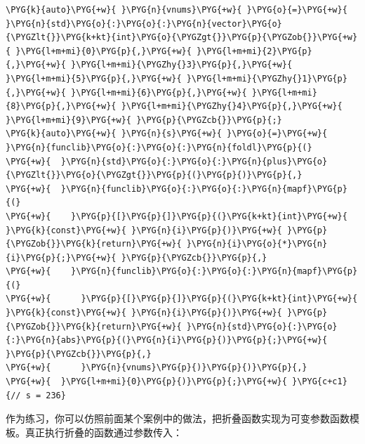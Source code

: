 
\begin{codeblockbg}
\begin{Verbatim}[commandchars=\\\{\},breaklines=true,breakanywhere=true,fontsize=\codefont,xleftmargin=17bp]
\PYG{k}{auto}\PYG{+w}{ }\PYG{n}{vnums}\PYG{+w}{ }\PYG{o}{=}\PYG{+w}{ }\PYG{n}{std}\PYG{o}{:}\PYG{o}{:}\PYG{n}{vector}\PYG{o}{\PYGZlt{}}\PYG{k+kt}{int}\PYG{o}{\PYGZgt{}}\PYG{p}{\PYGZob{}}\PYG{+w}{ }\PYG{l+m+mi}{0}\PYG{p}{,}\PYG{+w}{ }\PYG{l+m+mi}{2}\PYG{p}{,}\PYG{+w}{ }\PYG{l+m+mi}{\PYGZhy{}3}\PYG{p}{,}\PYG{+w}{ }\PYG{l+m+mi}{5}\PYG{p}{,}\PYG{+w}{ }\PYG{l+m+mi}{\PYGZhy{}1}\PYG{p}{,}\PYG{+w}{ }\PYG{l+m+mi}{6}\PYG{p}{,}\PYG{+w}{ }\PYG{l+m+mi}{8}\PYG{p}{,}\PYG{+w}{ }\PYG{l+m+mi}{\PYGZhy{}4}\PYG{p}{,}\PYG{+w}{ }\PYG{l+m+mi}{9}\PYG{+w}{ }\PYG{p}{\PYGZcb{}}\PYG{p}{;}
\PYG{k}{auto}\PYG{+w}{ }\PYG{n}{s}\PYG{+w}{ }\PYG{o}{=}\PYG{+w}{ }\PYG{n}{funclib}\PYG{o}{:}\PYG{o}{:}\PYG{n}{foldl}\PYG{p}{(}
\PYG{+w}{  }\PYG{n}{std}\PYG{o}{:}\PYG{o}{:}\PYG{n}{plus}\PYG{o}{\PYGZlt{}}\PYG{o}{\PYGZgt{}}\PYG{p}{(}\PYG{p}{)}\PYG{p}{,}
\PYG{+w}{  }\PYG{n}{funclib}\PYG{o}{:}\PYG{o}{:}\PYG{n}{mapf}\PYG{p}{(}
\PYG{+w}{    }\PYG{p}{[}\PYG{p}{]}\PYG{p}{(}\PYG{k+kt}{int}\PYG{+w}{ }\PYG{k}{const}\PYG{+w}{ }\PYG{n}{i}\PYG{p}{)}\PYG{+w}{ }\PYG{p}{\PYGZob{}}\PYG{k}{return}\PYG{+w}{ }\PYG{n}{i}\PYG{o}{*}\PYG{n}{i}\PYG{p}{;}\PYG{+w}{ }\PYG{p}{\PYGZcb{}}\PYG{p}{,}
\PYG{+w}{    }\PYG{n}{funclib}\PYG{o}{:}\PYG{o}{:}\PYG{n}{mapf}\PYG{p}{(}
\PYG{+w}{      }\PYG{p}{[}\PYG{p}{]}\PYG{p}{(}\PYG{k+kt}{int}\PYG{+w}{ }\PYG{k}{const}\PYG{+w}{ }\PYG{n}{i}\PYG{p}{)}\PYG{+w}{ }\PYG{p}{\PYGZob{}}\PYG{k}{return}\PYG{+w}{ }\PYG{n}{std}\PYG{o}{:}\PYG{o}{:}\PYG{n}{abs}\PYG{p}{(}\PYG{n}{i}\PYG{p}{)}\PYG{p}{;}\PYG{+w}{ }\PYG{p}{\PYGZcb{}}\PYG{p}{,}
\PYG{+w}{      }\PYG{n}{vnums}\PYG{p}{)}\PYG{p}{)}\PYG{p}{,}
\PYG{+w}{  }\PYG{l+m+mi}{0}\PYG{p}{)}\PYG{p}{;}\PYG{+w}{ }\PYG{c+c1}{// s = 236}
\end{Verbatim}
\end{codeblockbg}



作为练习，你可以仿照前面某个案例中的做法，把折叠函数实现为可变参数函数模板。真正执行折叠的函数通过参数传入：



